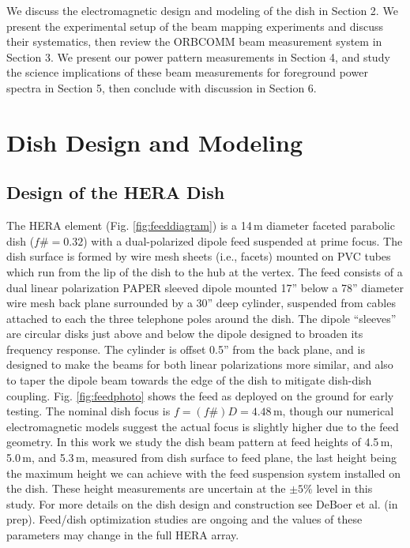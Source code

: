\documentclass{emulateapj}
\begin{document}
We discuss the electromagnetic design and modeling of the dish in Section 2. We present the 
experimental setup of the beam mapping experiments and discuss their systematics, then 
review the ORBCOMM beam measurement system in Section 3. We present our power pattern 
measurements in Section 4, and study the science implications of these beam measurements for foreground power spectra in Section 5, then conclude with discussion in Section 6.

\section{Dish Design and Modeling}

\subsection{Design of the HERA Dish}

The HERA element (Fig. \ref{fig:feeddiagram}) is a 14\,m diameter faceted parabolic dish ($f\#=0.32$) with a dual-polarized dipole feed suspended at prime focus. The dish surface is formed by wire mesh sheets (i.e., facets) mounted on PVC tubes which run from the lip of the dish to the hub at the vertex. The feed consists of a dual linear polarization PAPER sleeved dipole mounted 17'' below a 78'' diameter wire mesh back plane surrounded by a 30'' deep cylinder, suspended from cables attached to each the three telephone poles around the dish. The dipole ``sleeves'' are circular disks just above and below the dipole designed to broaden its frequency response. The cylinder is offset 0.5'' from the back plane, and is designed to make the beams for both linear polarizations more similar, and also to taper the dipole beam towards the edge of the dish to mitigate dish-dish coupling. Fig. \ref{fig:feedphoto} shows the feed as deployed on the ground for early testing.  The nominal dish focus is $f=(f\#)D=4.48$\,m, though our numerical electromagnetic models suggest the actual focus is slightly higher due to the feed geometry. In this work we study the dish beam pattern at feed heights of 4.5\,m, 5.0\,m, and 5.3\,m, measured from dish surface to feed plane, the last height being the maximum height we can achieve with the feed suspension system installed on the dish. These height measurements are uncertain at the $\pm5\%$ level in this study. For more details on the dish design and construction see DeBoer et al. (in prep). Feed/dish optimization studies are ongoing and the values of these parameters may change in the full HERA array. 
\end{document}
